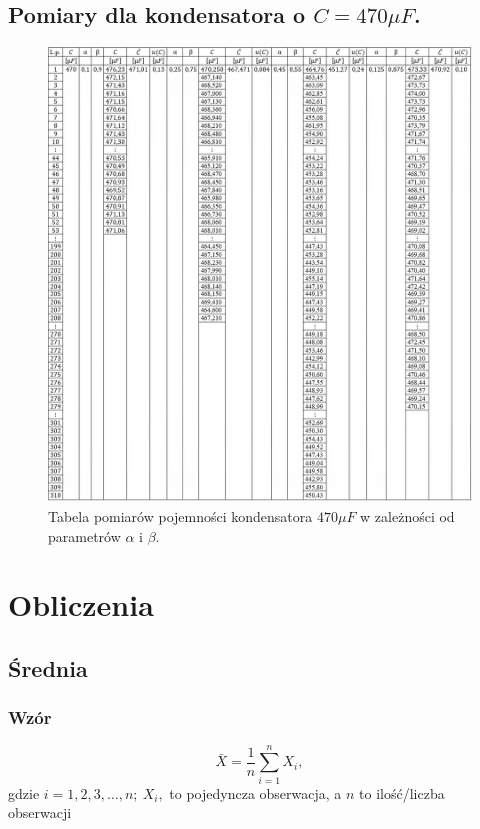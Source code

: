 \documentclass[12pt]{mwart}
\begin{document}
	\subsection{Pomiary dla kondensatora o $C=470\mu F$.}
	\begin{figure}[H]
		\centering
		\includegraphics[width=1\linewidth, height=.93\textheight]{data/470_tab.jpg}
		\caption{Tabela pomiarów pojemności kondensatora $470\mu F$ w zależności od parametrów $\alpha$ i $\beta$.}
	\end{figure}
	\section{Obliczenia}
	\subsection{Średnia}
	\subsubsection{Wzór}
	\begin{equation}
		\bar X = \frac{1}{n}\sum\limits_{i=1}^{n} X_{i},
	\end{equation}
	gdzie $i=1,2,3,\dots ,n; \ X_{i},$ to pojedyncza obserwacja, a $n$ to ilość/liczba obserwacji
\end{document}
